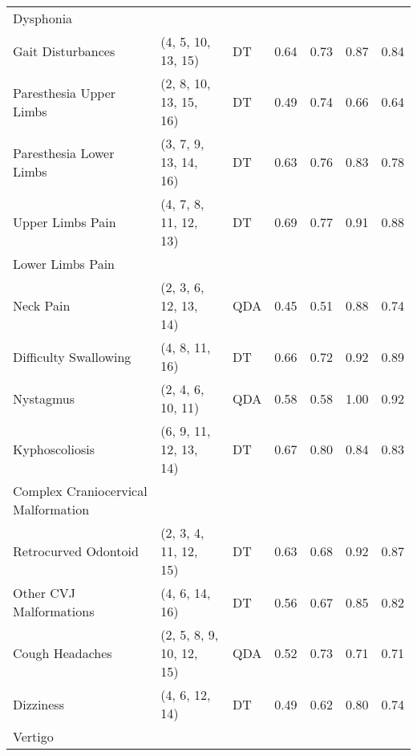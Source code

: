 \begin{tabular}{lllllll}
                           Dysphonia &                            &           &      &      &      &      \\
                   Gait Disturbances &         (4, 5, 10, 13, 15) &        DT & 0.64 & 0.73 & 0.87 & 0.84 \\
             Paresthesia Upper Limbs &     (2, 8, 10, 13, 15, 16) &        DT & 0.49 & 0.74 & 0.66 & 0.64 \\
             Paresthesia Lower Limbs &      (3, 7, 9, 13, 14, 16) &        DT & 0.63 & 0.76 & 0.83 & 0.78 \\
                    Upper Limbs Pain &      (4, 7, 8, 11, 12, 13) &        DT & 0.69 & 0.77 & 0.91 & 0.88 \\
                    Lower Limbs Pain &                            &           &      &      &      &      \\
                           Neck Pain &      (2, 3, 6, 12, 13, 14) &       QDA & 0.45 & 0.51 & 0.88 & 0.74 \\
               Difficulty Swallowing &             (4, 8, 11, 16) &        DT & 0.66 & 0.72 & 0.92 & 0.89 \\
                           Nystagmus &          (2, 4, 6, 10, 11) &       QDA & 0.58 & 0.58 & 1.00 & 0.92 \\
                      Kyphoscoliosis &     (6, 9, 11, 12, 13, 14) &        DT & 0.67 & 0.80 & 0.84 & 0.83 \\
 Complex Craniocervical Malformation &                            &           &      &      &      &      \\
                Retrocurved Odontoid &      (2, 3, 4, 11, 12, 15) &        DT & 0.63 & 0.68 & 0.92 & 0.87 \\
             Other CVJ Malformations &             (4, 6, 14, 16) &        DT & 0.56 & 0.67 & 0.85 & 0.82 \\
                     Cough Headaches &   (2, 5, 8, 9, 10, 12, 15) &       QDA & 0.52 & 0.73 & 0.71 & 0.71 \\
                           Dizziness &             (4, 6, 12, 14) &        DT & 0.49 & 0.62 & 0.80 & 0.74 \\
                             Vertigo &                            &           &      &      &      &      \\
\bottomrule
\end{tabular}
